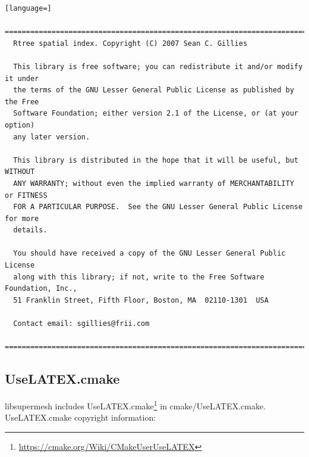 \documentclass{article}
\begin{document}
\begin{lstlisting}[language=]
  =============================================================================
  Rtree spatial index. Copyright (C) 2007 Sean C. Gillies
 
  This library is free software; you can redistribute it and/or modify it under
  the terms of the GNU Lesser General Public License as published by the Free
  Software Foundation; either version 2.1 of the License, or (at your option)
  any later version.
 
  This library is distributed in the hope that it will be useful, but WITHOUT
  ANY WARRANTY; without even the implied warranty of MERCHANTABILITY or FITNESS
  FOR A PARTICULAR PURPOSE.  See the GNU Lesser General Public License for more
  details.
 
  You should have received a copy of the GNU Lesser General Public License 
  along with this library; if not, write to the Free Software Foundation, Inc.,
  51 Franklin Street, Fifth Floor, Boston, MA  02110-1301  USA
 
  Contact email: sgillies@frii.com
  =============================================================================
\end{lstlisting}

\subsection{UseLATEX.cmake}

libsupermesh includes
UseLATEX.cmake\footnote{\url{https://cmake.org/Wiki/CMakeUserUseLATEX}} in
cmake/UseLATEX.cmake. UseLATEX.cmake copyright information:
\end{document}
